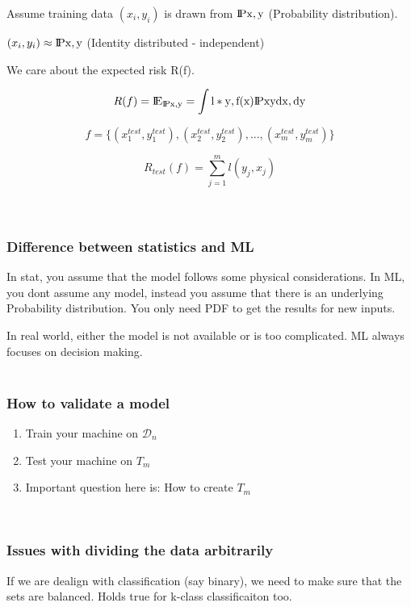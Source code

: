\documentclass{article}
\begin{document}
Assume training data \( (x_{i}, y_{i}) \) is drawn from \(\rm I\!Px,y \) (Probability distribution).

\( (x_{i}, y_{i}) \approx  \rm I\!Px, y \) (Identity distributed - independent)


We care about the expected risk R(f).

\begin{equation*}
R(f) = \rm I\!E_{\rm I\!Px,y} = \int l*y, f(x)\rm I\!Pxy  dx,  dy
\end{equation*}

\begin{equation*}
f = \{ (x_{1}^{test}, y_{1}^{test} ), (x_{2}^{test}, y_{2}^{test} ), ... , (x_{m}^{test}, y_{m}^{test} ) \}
\end{equation*}

\begin{equation*}
	R_{test}(f) = \sum_{j = 1}^{m} l(y_{j}, x_{j})
\end{equation*}
 \\\\
\subsubsection*{Difference between statistics and ML}
In stat, you assume that the model follows some physical considerations.  In ML, you dont assume any model, instead you assume that there is an underlying Probability distribution.  You only need PDF to get the results for new inputs.


In real world, either the model is not available or is too complicated.  ML always focuses on decision making.\\\\
\subsubsection*{How to validate a model}
\begin{enumerate}
	\item Train your machine on \( \mathcal{D}_{n} \)
	\item Test your machine on \( T_{m} \)
	\item Important question here is: How to create \( T_{m} \)
\end{enumerate}
\
\subsubsection*{Issues with dividing the data arbitrarily}
If we are dealign with classification (say binary), we need to make sure that the sets are balanced. Holds true for k-class classificaiton too.
\end{document}
